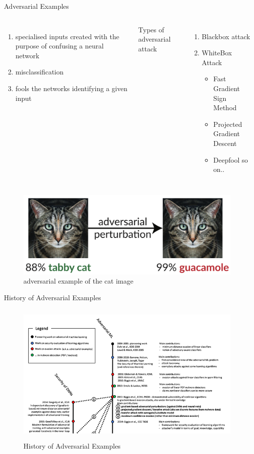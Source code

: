 \documentclass{beamer}		%
\begin{document}
\begin{frame}{Adversarial Examples}
\begin{columns}
\begin{enumerate}
\item specialised inputs created with 
the purpose of confusing a neural network
\item misclassification
\item fools the networks identifying a given input
\end{enumerate}
Types of adversarial attack
\begin{enumerate}
    \item Blackbox attack
    \item WhiteBox Attack
    \begin{itemize}
        \item Fast Gradient Sign Method
        \item Projected Gradient Descent
        \item Deepfool
        so on..
    \end{itemize}
    
\end{enumerate}
\end{columns}
\begin{figure}
    \centering
    \includegraphics[height=3 cm]{example_adversarial_examples.png}
    \caption{adversarial example of the cat image}
\end{figure}

\end{frame}	
\begin{frame}{History of Adversarial Examples}	
\begin{figure}
\includegraphics[height=7cm]{basic_image_adversaries_history.png}
\caption{History of Adversarial Examples}
\end{figure}
\end{frame}	
\end{document}
